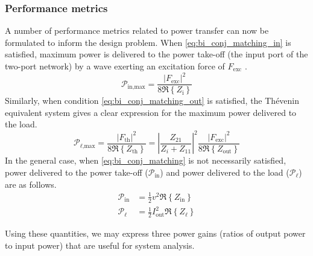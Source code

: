 \documentclass[twocolumn]{autart}
\begin{document}
\subsubsection{Performance metrics}\label{sec:performance_metrics}
A number of performance metrics related to power transfer can now be formulated to inform the design problem.
When \eqref{eq:bi_conj_matching_in} is satisfied, maximum power is delivered to the power take-off (the input port of the two-port network) by a wave exerting an excitation force of $F_{\textrm{exc}}$ \cite{Falnes:2002aa}.
%
\begin{equation}
        \mathcal{P}_{\textrm{in,max}} = \frac{| F_{\textrm{exc}} |^2 }{ 8 \Re \left\{ Z_{\textrm{i}} \right\} }
\end{equation}
%
Similarly, when condition \eqref{eq:bi_conj_matching_out} is satisfied, the Th\'{e}venin equivalent system gives a clear expression for the maximum power delivered to the load.
%
\begin{equation}
        \mathcal{P}_{\ell\textrm{,max}} = \frac{| F_{\textrm{th}} |^2 }{ 8 \Re \left\{ Z_{\textrm{th}} \right\} }
        = \left| \frac{ Z_{21} }{ Z_i + Z_{11} } \right| ^2 \frac{ | F_{\textrm{exc}} |^2 }{ 8 \Re \left\{ Z_{\textrm{out}} \right\} } \label{eq:max_power_delivered_thevenin}
\end{equation}
%
In the general case, when \eqref{eq:bi_conj_matching} is not necessarily satisfied, power delivered to the power take-off ($\mathcal{P}_{\textrm{in}}$) and power delivered to the load ($\mathcal{P}_\ell$) are as follows.
\begin{subequations}
        \begin{align}
                \mathcal{P}_{\textrm{in}} &= \frac{1}{2} v^2 \Re \left\{ Z_{\textrm{in}} \right\}\\
                \mathcal{P}_\ell &= \frac{1}{2} I_{\textrm{out}}^2 \Re \left\{ Z_{\ell} \right\}
        \end{align}
\end{subequations}

Using these quantities, we may express three power gains (ratios of output power to input power) that are useful for system analysis. 
\end{document}
